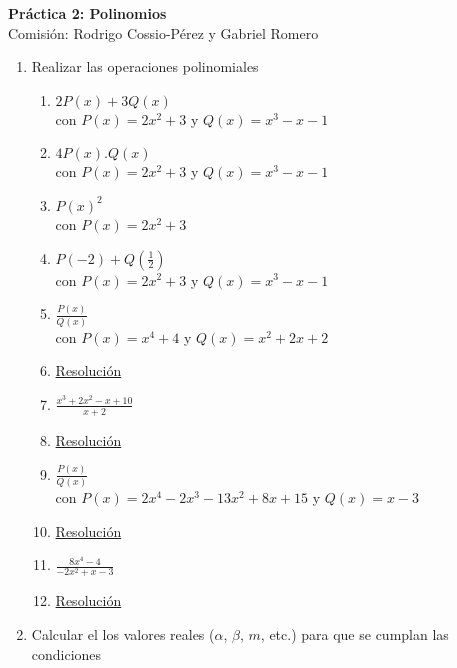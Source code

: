 \documentclass[a4paper]{article}
\newcommand{\answer}{\item[**]}
\newcommand{\exercise}{\item}
\newcommand{\df}[2]{\displaystyle\frac{#1}{#2}}
\begin{document}
\noindent \hrulefill 
\vspace{-7pt}
\begin{center} 
	\textbf{ Práctica 2: Polinomios } \\
	Comisión: Rodrigo Cossio-Pérez y Gabriel Romero
\end{center}
\vspace{-10pt}
\hrulefill


\begin{enumerate}

	\exercise Realizar las operaciones polinomiales
	\begin{multicols}{2}
	\begin{enumerate} [label=(\alph*)]
		
		\item $2P(x)+3Q(x)$ \\con $P(x)=2x^2+3$ y $Q(x)=x^3-x-1$
		\item $4P(x).Q(x)$ \\con $P(x)=2x^2+3$ y $Q(x)=x^3-x-1$
		\item $P(x)^2$ \\con $P(x)=2x^2+3$
		\item $P(-2)+Q\left(\df{1}{2}\right)$ \\con $P(x)=2x^2+3$ y $Q(x)=x^3-x-1$

		\item $\df{P(x)}{Q(x)}$ \\con $P(x)=x^4+4$ y $Q(x)=x^2+2x+2$
		\answer \href{https://youtu.be/DWDi7BKAKbc}{Resolución}

		\item $\df{x^3+2x^2-x+10}{x+2}$
		\answer \href{https://youtu.be/bfCWsvZfFq0}{Resolución}

		\item $\df{P(x)}{Q(x)}$ \\con $P(x)=2x^4-2x^3-13x^2+8x+15$ y $Q(x)=x-3$
		\answer \href{https://youtu.be/W3HcTD4IC94}{Resolución}

		\item $\df{8x^4-4}{-2x^2+x-3}$
		\answer \href{https://youtu.be/0Dw3MAwrA34}{Resolución}

	\end{enumerate}
	\end{multicols}

	\exercise Calcular el los valores reales ($\alpha$, $\beta$, $m$, etc.) para que se cumplan las condiciones

	\begin{multicols}{2}
	\begin{enumerate} [label=(\alph*)]
		

\end{enumerate}
\end{multicols}
\end{enumerate}
\end{document}
